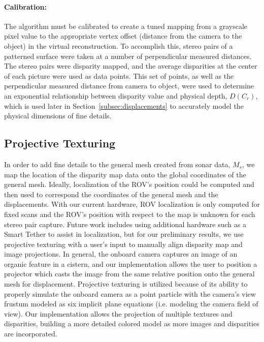 \documentclass{llncs}
\begin{document}

\paragraph{\textbf{Calibration:}}
The algorithm must be calibrated to create a tuned mapping from a grayscale pixel value to the appropriate vertex offset (distance from the camera to the object) in the virtual reconstruction. To accomplish this, stereo pairs of a patterned surface were taken at a number of perpendicular measured distances. The stereo pairs were disparity mapped, and the average disparities at the center of each picture were used as data points. This set of points, as well as the perpendicular measured distance from camera to object, were used to determine an exponential relationship between disparity value and physical depth, $D(C_r)$, which is used later in Section~\ref{subsec:displacements} to accurately model the physical dimensions of fine details.

\subsection{Projective Texturing}
\label{subsec:projectiveTexturing}
\noindent In order to add fine details to the general mesh created from sonar data, $M_s$, we map the location of the disparity map data onto the global coordinates of the general mesh. Ideally, localization of the ROV's position could be computed and then used to correspond the coordinates of the general mesh and the displacements. With our current hardware, ROV localization is only computed for fixed scans and the ROV's position with respect to the map is unknown for each stereo pair capture. Future work includes using additional hardware such as a Smart Tether to assist in localization, but for our preliminary results, we use projective texturing with a user's input to manually align disparity map and image projections. In general, the onboard camera captures an image of an organic feature in a cistern, and our implementation allows the user to position a projector which casts the image from the same relative position onto the general mesh for displacement. Projective texturing is utilized because of its ability to properly simulate the onboard camera as a point particle with the camera's view frustum modeled as six implicit plane equations (i.e. modeling the camera field of view). Our implementation allows the projection of multiple textures and disparities, building a more detailed colored model as more images and disparities are incorporated.
\end{document}
